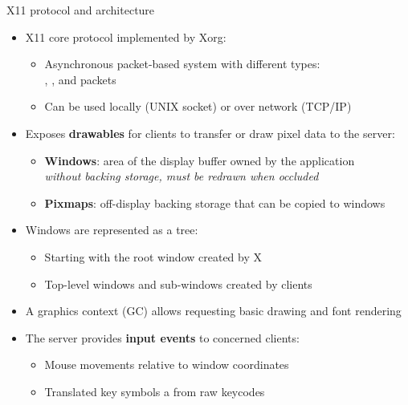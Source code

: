 \begin{frame}{X11 protocol and architecture}
  \begin{itemize}
  \item X11 core protocol implemented by Xorg:
    \begin{itemize}
    \item Asynchronous packet-based system with different types:\\
    , ,  and  packets
    \item Can be used locally (UNIX socket) or over network (TCP/IP)
    \end{itemize}
  \item Exposes \textbf{drawables} for clients to transfer or draw pixel data to the server:
    \begin{itemize}
    \item \textbf{Windows}: area of the display buffer owned by the application\\
      \textit{without backing storage, must be redrawn when occluded}
    \item \textbf{Pixmaps}: off-display backing storage that can be copied to windows
    \end{itemize}
  \item Windows are represented as a tree:
    \begin{itemize}
    \item Starting with the root window created by X
    \item Top-level windows and sub-windows created by clients
    \end{itemize}
  \item A graphics context (GC) allows requesting basic drawing and font rendering
  \item The server provides \textbf{input events} to concerned clients:
    \begin{itemize}
    \item Mouse movements relative to window coordinates
    \item Translated key symbols a from raw keycodes
    \end{itemize}
  \end{itemize}
\end{frame}

